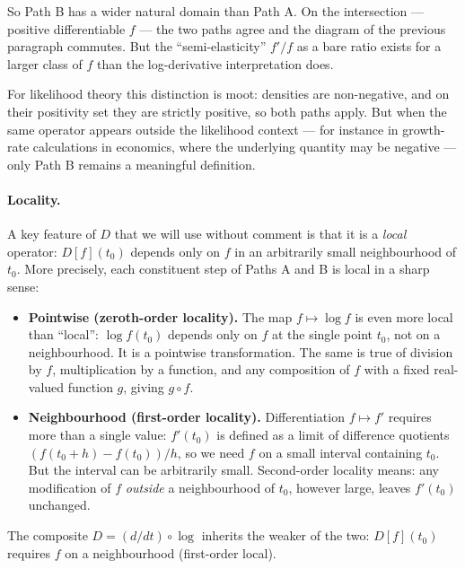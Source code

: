 \documentclass[a4paper,oneside,12pt]{extarticle}
\theoremstyle{plain}
\theoremstyle{definition}
\theoremstyle{remark}
\begin{document}
So Path B has a wider natural domain than Path A.  On the
intersection --- positive differentiable $f$ --- the two paths agree
and the diagram of the previous paragraph commutes.  But the
``semi-elasticity'' $f'/f$ as a bare ratio exists for a larger class
of $f$ than the log-derivative interpretation does.

For likelihood theory this distinction is moot: densities are
non-negative, and on their positivity set they are strictly positive,
so both paths apply.  But when the same operator appears outside
the likelihood context --- for instance in growth-rate calculations
in economics, where the underlying quantity may be negative ---
only Path B remains a meaningful definition.

\paragraph{Locality.}
A key feature of $D$ that we will use without comment is that it is
a \emph{local} operator: $D[f](t_0)$ depends only on $f$ in an
arbitrarily small neighbourhood of $t_0$.  More precisely, each
constituent step of Paths A and B is local in a sharp sense:

\begin{itemize}
\item \textbf{Pointwise (zeroth-order locality).}
  The map $f \mapsto \log f$ is even more local than ``local'':
  $\log f(t_0)$ depends only on $f$ at the single point $t_0$, not on
  a neighbourhood.  It is a pointwise transformation.  The same is
  true of division by $f$, multiplication by a function, and any
  composition of $f$ with a fixed real-valued function $g$, giving
  $g\circ f$.

\item \textbf{Neighbourhood (first-order locality).}
  Differentiation $f \mapsto f'$ requires more than a single value:
  $f'(t_0)$ is defined as a limit of difference quotients
  $(f(t_0+h)-f(t_0))/h$, so we need $f$ on a small interval
  containing $t_0$.  But the interval can be arbitrarily small.
  Second-order locality means: any modification of $f$ \emph{outside}
  a neighbourhood of $t_0$, however large, leaves $f'(t_0)$
  unchanged.
\end{itemize}

The composite $D = (d/dt) \circ \log$ inherits the weaker of the
two: $D[f](t_0)$ requires $f$ on a neighbourhood (first-order local).
\end{document}
